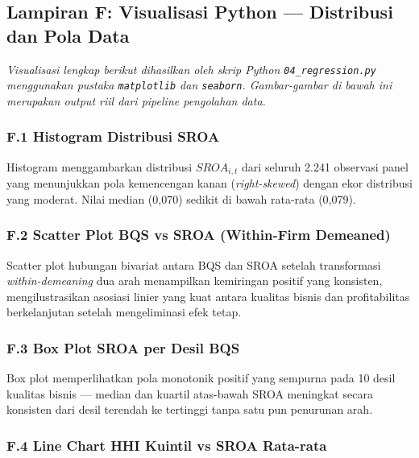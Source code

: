 \documentclass[12pt,a4paper]{article}
\begin{document}
\subsection{Lampiran F: Visualisasi Python --- Distribusi dan Pola
Data}\label{lampiran-f-visualisasi-python-distribusi-dan-pola-data}

\emph{Visualisasi lengkap berikut dihasilkan oleh skrip Python
\texttt{04\_regression.py} menggunakan pustaka \texttt{matplotlib} dan
\texttt{seaborn}. Gambar-gambar di bawah ini merupakan output riil dari
pipeline pengolahan data.}

\subsubsection{F.1 Histogram Distribusi
SROA}\label{f.1-histogram-distribusi-sroa}

Histogram menggambarkan distribusi \(SROA_{i,t}\) dari seluruh 2.241
observasi panel yang menunjukkan pola kemencengan kanan
(\emph{right-skewed}) dengan ekor distribusi yang moderat. Nilai median
(0,070) sedikit di bawah rata-rata (0,079).

\subsubsection{F.2 Scatter Plot BQS vs SROA (Within-Firm
Demeaned)}\label{f.2-scatter-plot-bqs-vs-sroa-within-firm-demeaned}

Scatter plot hubungan bivariat antara BQS dan SROA setelah transformasi
\emph{within-demeaning} dua arah menampilkan kemiringan positif yang
konsisten, mengilustrasikan asosiasi linier yang kuat antara kualitas
bisnis dan profitabilitas berkelanjutan setelah mengeliminasi efek
tetap.

\subsubsection{F.3 Box Plot SROA per Desil
BQS}\label{f.3-box-plot-sroa-per-desil-bqs}

Box plot memperlihatkan pola monotonik positif yang sempurna pada 10
desil kualitas bisnis --- median dan kuartil atas-bawah SROA meningkat
secara konsisten dari desil terendah ke tertinggi tanpa satu pun
penurunan arah.

\subsubsection{F.4 Line Chart HHI Kuintil vs SROA
Rata-rata}\label{f.4-line-chart-hhi-kuintil-vs-sroa-rata-rata}
\end{document}
